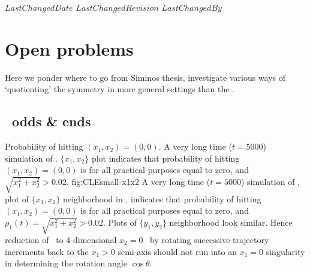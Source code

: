 {$LastChangedDate$}
{$LastChangedRevision$} {$LastChangedBy$}


\chapter{Open problems}
\label{chap:open}

Here we ponder where to go from
Siminos thesis, investigate various ways
of `quotienting' the  symmetry in more general settings than
the \cLe.

\section{\CLe\ odds \& ends}


{Probability of hitting $(x_1,x_2) =(0,0)$.}{
%
{}{
A very long time ($t=5000$) simulation of \cLf. $\{x_1,x_2\}$ plot indicates
that probability of hitting $(x_1,x_2) =(0,0)$ is for all practical purposes
equal to zero, and $\sqrt{x_1^2+x_2^2} > 0.02$.
}
{fig:CLEsmall-x1x2}
%
A very long time ($t=5000$) simulation of \cLf, plot of
$\{x_1,x_2\}$  neighborhood in ,
indicates that probability of hitting $(x_1,x_2) =(0,0)$ is
for all practical purposes equal to zero, and
$\rho_1(t)=\sqrt{x_1^2+x_2^2} > 0.02$. Plots of $\{y_1,y_2\}$
neighborhood look similar.
Hence reduction of \statesp\ to 4-dimensional $x_2=0$ \reducedsp\ by rotating successive trajectory increments back
to the $x_1>0$ semi-axis should not run into an $x_1 =0$
singularity in determining the rotation angle $\cos\theta$.
    } %


